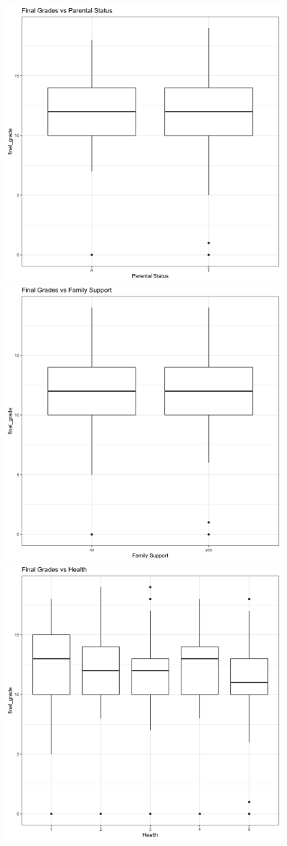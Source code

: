 \documentclass[]{article}
\begin{document}
\includegraphics[width=0.8\textwidth,height=\textheight]{images/Final Grade vs Parental status.png}~\includegraphics[width=0.8\textwidth,height=\textheight]{images/Final Grade vs Family Support.png}
\includegraphics[width=0.8\textwidth,height=\textheight]{images/Final Grade vs Health.png}
\end{document}
